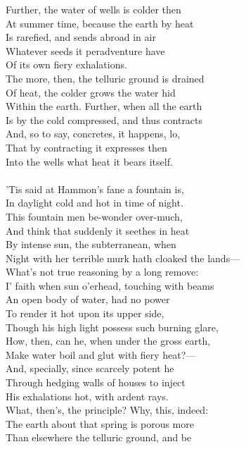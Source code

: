 Further, the water of wells is colder then\\
At summer time, because the earth by heat\\
Is rarefied, and sends abroad in air\\
Whatever seeds it peradventure have\\
Of its own fiery exhalations.\\
The more, then, the telluric ground is drained\\
Of heat, the colder grows the water hid\\
Within the earth. Further, when all the earth\\
Is by the cold compressed, and thus contracts\\
And, so to say, concretes, it happens, lo,\\
That by contracting it expresses then\\
Into the wells what heat it bears itself.\\
\\
'Tis said at Hammon's fane a fountain is,\\
In daylight cold and hot in time of night.\\
This fountain men be-wonder over-much,\\
And think that suddenly it seethes in heat\\
By intense sun, the subterranean, when\\
Night with her terrible murk hath cloaked the lands—\\
What's not true reasoning by a long remove:\\
I' faith when sun o'erhead, touching with beams\\
An open body of water, had no power\\
To render it hot upon its upper side,\\
Though his high light possess such burning glare,\\
How, then, can he, when under the gross earth,\\
Make water boil and glut with fiery heat?—\\
And, specially, since scarcely potent he\\
Through hedging walls of houses to inject\\
His exhalations hot, with ardent rays.\\
What, then's, the principle? Why, this, indeed:\\
The earth about that spring is porous more\\
Than elsewhere the telluric ground, and be\\
